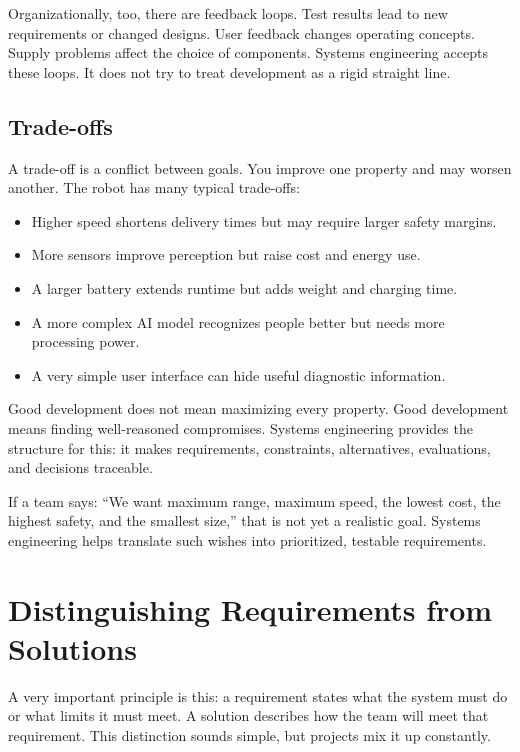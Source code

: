 Organizationally, too, there are feedback loops. Test results lead to new requirements or changed designs. User feedback changes operating concepts. Supply problems affect the choice of components. Systems engineering accepts these loops. It does not try to treat development as a rigid straight line.

\subsection{Trade-offs}
A trade-off is a conflict between goals. You improve one property and may worsen another. The robot has many typical trade-offs:

\begin{itemize}
    \item Higher speed shortens delivery times but may require larger safety margins.
    \item More sensors improve perception but raise cost and energy use.
    \item A larger battery extends runtime but adds weight and charging time.
    \item A more complex AI model recognizes people better but needs more processing power.
    \item A very simple user interface can hide useful diagnostic information.
\end{itemize}

Good development does not mean maximizing every property. Good development means finding well-reasoned compromises. Systems engineering provides the structure for this: it makes requirements, constraints, alternatives, evaluations, and decisions traceable.

\begin{hinweisbox}
If a team says: \enquote{We want maximum range, maximum speed, the lowest cost, the highest safety, and the smallest size,} that is not yet a realistic goal. Systems engineering helps translate such wishes into prioritized, testable requirements.
\end{hinweisbox}

\section{Distinguishing Requirements from Solutions}
A very important principle is this: a requirement states what the system must do or what limits it must meet. A solution describes how the team will meet that requirement. This distinction sounds simple, but projects mix it up constantly.

